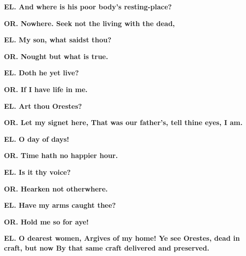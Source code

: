 \documentclass[11pt,letter]{book}
\begin{document}
\par \textbf{EL. And where is his poor body’s resting-place?}
\par 

\par \textbf{OR. Nowhere. Seek not the living with the dead,}
\par 

\par \textbf{EL. My son, what saidst thou?}
\par 

\par \textbf{OR. Nought but what is true.}
\par 

\par \textbf{EL. Doth he yet live?}
\par 

\par \textbf{OR. If I have life in me.}
\par 

\par \textbf{EL. Art thou Orestes?}
\par 

\par \textbf{OR. Let my signet here, That was our father’s, tell thine eyes, I am.}
\par 

\par \textbf{EL. O day of days!}
\par 

\par \textbf{OR. Time hath no happier hour.}
\par 

\par \textbf{EL. Is it thy voice?}
\par 

\par \textbf{OR. Hearken not otherwhere.}
\par 

\par \textbf{EL. Have my arms caught thee?}
\par 

\par \textbf{OR. Hold me so for aye!}
\par 

\par \textbf{EL. O dearest women, Argives of my home! Ye see Orestes, dead in craft, but now By that same craft delivered and preserved.}
\par 
\end{document}
